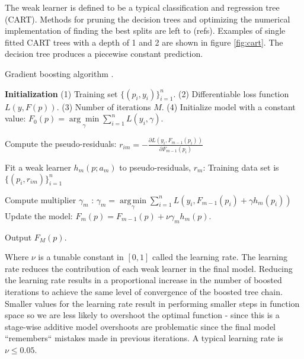 The  weak learner is defined to be a typical classification and regression tree (CART).  Methods for pruning the decision trees and optimizing the numerical implementation of finding the best splits are left to (refs).  Examples of single fitted CART trees with a depth of 1 and 2 are shown in figure \ref{fig:cart}.  The decision tree produces a piecewise constant prediction.

\begin{algorithm}[H]
    \caption{Gradient boosting algorithm \cite{friedman2002}.}
    \begin{algorithmic}
    \STATE \textbf{Initialization} 
    \STATE (1) Training set $\{(p_i, y_i)\}_{i=1}^n$. 
    \STATE (2) Differentiable loss function $L(y, F(p))$. 
    \STATE (3) Number of iterations ${{M}}$.
    \STATE (4)   Initialize model with a constant value:
        $F_0(p) = \underset{\gamma}{\arg\min} \sum_{i=1}^n L(y_i, \gamma).$
    
        \STATE Compute the pseudo-residuals:  
            \STATE $r_{im} = -\frac{\partial L(y_i, F_{m-1}(p_i))}{\partial F_{m-1}(p_i)}$
        \ENDFOR
        
        \STATE Fit a weak learner $h_m(p; a_m)$ to pseudo-residuals, $r_{m}$: Training data set is $\{(p_i, r_{im})\}_{i=1}^n$ \;
        
        \STATE Compute multiplier $\gamma_m$ :
        $\gamma_m = \underset{\gamma}{\operatorname{arg\,min}} \sum_{i=1}^n L\left(y_i, F_{m-1}(p_i) + \gamma h_m(p_i)\right)$\;
        \STATE Update the model:
        $F_m(p) = F_{m-1}(p) + \nu \gamma_m h_m(p).$
    
    \ENDFOR
    \STATE Output $F_M(p).$
    \end{algorithmic}
\label{alg:boosting}
\end{algorithm}
Where $\nu$ is a tunable constant in $[0, 1]$ called the learning rate.  The learning rate reduces the contribution of each weak learner in the final model.  Reducing the learning rate results in a proportional increase in the number of boosted iterations to achieve the same level of convergence of the boosted tree chain.  Smaller values for the learning rate result in performing smaller steps in function space so we are less likely to overshoot the optimal function - since this is a stage-wise additive model overshoots are problematic since the final model ``remembers`` mistakes made in previous iterations.  A typical learning rate is $\nu\leq 0.05$.

